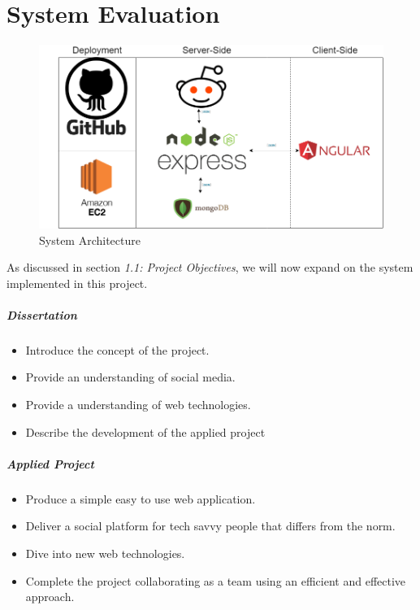 \chapter{System Evaluation} \label{eval}

\begin{figure}[H]
  \includegraphics[width=\linewidth]{img/Diagram.png}
  \caption{System Architecture}
  \label{fig:GHP}
\end{figure}

As discussed in section \textit{1.1: Project Objectives}, we will now expand on the system implemented in this project.

\paragraph{Dissertation}
\begin{itemize}
\item Introduce the concept of the project. 
\item Provide an understanding of social media.
\item Provide a understanding of web technologies.
\item Describe the development of the applied project
\end{itemize}
 
 \paragraph{Applied Project}
\begin{itemize}
\item Produce a simple easy to use web application.
\item Deliver a social platform for tech savvy people that differs from the norm.
\item Dive into new web technologies.
\item Complete the project collaborating as a team using an efficient and effective approach.
\end{itemize}

